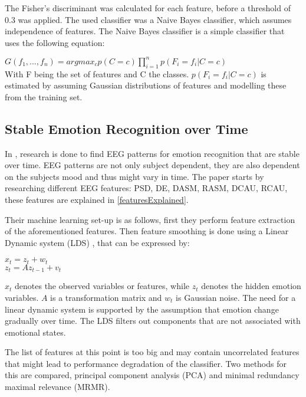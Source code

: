 \npar

The Fisher's discriminant was calculated for each feature, before a threshold of 0.3 was applied. The used classifier was a Naive Bayes classifier, which assumes independence of features. The Naive Bayes classifier is a simple classifier that uses the following equation:

\begin{center}
$G(f_1, ..., f_n) = argmax_c p(C=c) \prod\limits_{i=1}^n p(F_i=f_i|C=c)$ \\
With F being the set of features and C the classes. $p(F_i=f_i|C=c)$ is estimated by assuming Gaussian distributions of features and modelling these from the training set.
\end{center}

\subsection{Stable Emotion Recognition over Time}
In \citep{killyPaper}, research is done to find EEG patterns for emotion recognition that are stable over time. EEG patterns are not only subject dependent, they are also dependent on the subjects mood and thus might vary in time. The paper starts by researching different EEG features: PSD, DE, DASM, RASM, DCAU, RCAU, these features are explained in \ref{featuresExplained}.

\npar

Their machine learning set-up is as follows, first they perform feature extraction of the aforementioned features. Then feature smoothing is done using a Linear Dynamic system (LDS) , that can be expressed by:
\begin{center}
$x_t = z_t + w_t$\\
$z_t = Az_{t-1} + v_t$
\end{center}
$x_t$ denotes the observed variables or features, while $z_t$ denotes the hidden emotion variables. $A$ is a transformation matrix and $w_t$ is Gaussian noise. The need for a linear dynamic system is supported by the assumption that emotion change gradually over time. The LDS filters out components that are not associated with emotional states.

\npar

The list of features at this point is too big and may contain uncorrelated features that might lead to performance degradation of the classifier. Two methods for this are compared, principal component analysis (PCA) and minimal redundancy maximal relevance (MRMR). 

